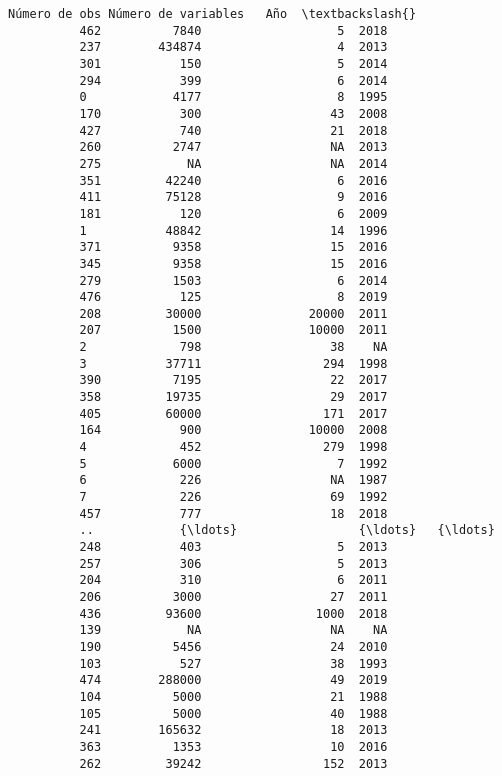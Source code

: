\documentclass[11pt]{article}
\begin{document}
\begin{Verbatim}[commandchars=\\\{\}]
              Número de obs Número de variables   Año  \textbackslash{}
          462          7840                   5  2018   
          237        434874                   4  2013   
          301           150                   5  2014   
          294           399                   6  2014   
          0            4177                   8  1995   
          170           300                  43  2008   
          427           740                  21  2018   
          260          2747                  NA  2013   
          275            NA                  NA  2014   
          351         42240                   6  2016   
          411         75128                   9  2016   
          181           120                   6  2009   
          1           48842                  14  1996   
          371          9358                  15  2016   
          345          9358                  15  2016   
          279          1503                   6  2014   
          476           125                   8  2019   
          208         30000               20000  2011   
          207          1500               10000  2011   
          2             798                  38    NA   
          3           37711                 294  1998   
          390          7195                  22  2017   
          358         19735                  29  2017   
          405         60000                 171  2017   
          164           900               10000  2008   
          4             452                 279  1998   
          5            6000                   7  1992   
          6             226                  NA  1987   
          7             226                  69  1992   
          457           777                  18  2018   
          ..            {\ldots}                 {\ldots}   {\ldots}   
          248           403                   5  2013   
          257           306                   5  2013   
          204           310                   6  2011   
          206          3000                  27  2011   
          436         93600                1000  2018   
          139            NA                  NA    NA   
          190          5456                  24  2010   
          103           527                  38  1993   
          474        288000                  49  2019   
          104          5000                  21  1988   
          105          5000                  40  1988   
          241        165632                  18  2013   
          363          1353                  10  2016   
          262         39242                 152  2013   

\end{Verbatim}
\end{document}
